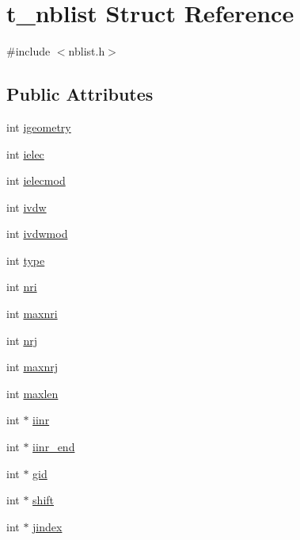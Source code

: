 \hypertarget{structt__nblist}{\section{t\-\_\-nblist \-Struct \-Reference}
\label{structt__nblist}
}


{\ttfamily \#include $<$nblist.\-h$>$}

\subsection*{\-Public \-Attributes}
\begin{DoxyCompactItemize}
\item 
int \hyperlink{structt__nblist_a372dc78e8e568f477eb57a1e81ec5bbb}{igeometry}
\item 
int \hyperlink{structt__nblist_a09642fb6fa2ce6ec50d293eb988535c7}{ielec}
\item 
int \hyperlink{structt__nblist_ab9f87ac1139ac41775a5e9e25e23d1fc}{ielecmod}
\item 
int \hyperlink{structt__nblist_a7dbf2c4a889eb17c4f0c680966ebee2c}{ivdw}
\item 
int \hyperlink{structt__nblist_afb634ed1c52c7ba1d61c796fec98da89}{ivdwmod}
\item 
int \hyperlink{structt__nblist_adef3366dba11683e13b96a4bd9517852}{type}
\item 
int \hyperlink{structt__nblist_a8f22a82d291ac367d3553ced6cf8b27e}{nri}
\item 
int \hyperlink{structt__nblist_a34cc93ac5a5ab179072184baca7e1e2a}{maxnri}
\item 
int \hyperlink{structt__nblist_aa7493670d44871e209f48702021ac944}{nrj}
\item 
int \hyperlink{structt__nblist_a31d210f5ce950c5a9a5a04c6f387a83c}{maxnrj}
\item 
int \hyperlink{structt__nblist_a61b7dd5e91f8bb8415a216fc0dae87c8}{maxlen}
\item 
int $\ast$ \hyperlink{structt__nblist_a20e220453d78e3f1317ed79ce2216371}{iinr}
\item 
int $\ast$ \hyperlink{structt__nblist_ab432db591ab7c32c391430e6003cf414}{iinr\-\_\-end}
\item 
int $\ast$ \hyperlink{structt__nblist_aa7d07dc54b27e73925e1b2ad55d46192}{gid}
\item 
int $\ast$ \hyperlink{structt__nblist_a62e38447f911aaea93dcb60f3db898e8}{shift}
\item 
int $\ast$ \hyperlink{structt__nblist_aab3fd33896d787d6a72b4a143fdbac02}{jindex}

\end{DoxyCompactItemize}
